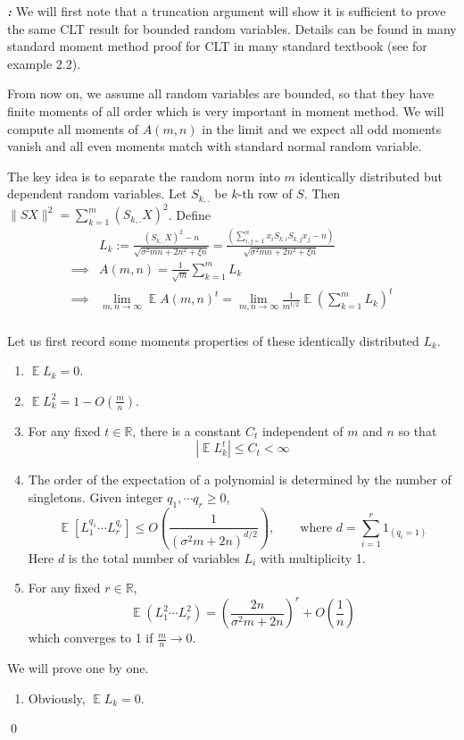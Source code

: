 \documentclass[12pt]{extarticle}
\renewenvironment{proof}[1][\proofname]{ { \it\bfseries #1: }}{\qed}
\newcommand{\field}[1]{\mathbb{#1}}
\newcommand{\R}{\field{R}}
\newcommand{\1}{\field{1}}
\DeclareMathOperator{\E}{\mathbb{E}}
\numberwithin{equation}{section}
\begin{document}
\begin{proof}
We will first note that a truncation argument will show it is sufficient to prove the same CLT result for bounded random variables. Details can be found in many standard moment method proof for CLT in many standard textbook (see for example \cite{tao2011topics} 2.2).

From now on, we assume all random variables are bounded, so that they have finite moments of all order which is very important in moment method. We will compute all moments of $A(m,n)$ in the limit and we expect all odd moments vanish and all even moments match with standard normal random variable.

The key idea is to separate the random norm into $m$ identically distributed but dependent random variables. Let $S_{k,.}$ be $k$-th row of $S$. Then $\|SX\|^2 = \sum_{k=1}^m (S_{k,.} X)^2$. Define 
\begin{align*}
 & L_k := \frac{(S_{k,.}X)^2 -n}{\sqrt{\sigma^2 mn+2n^2 + \xi n}} 
 =\frac{(\sum_{i,j=1}^n x_i S_{k,i} S_{k,j}x_j -n)}{\sqrt{\sigma^2 mn+2n^2 + \xi n}}  \\ 
\implies & A(m,n) = \frac{1}{\sqrt{m}} \sum_{k=1}^m L_k \\
\implies & \lim_{m,n\to \infty} \E A(m,n)^t
=\lim_{m,n\to \infty} \frac{1}{m^{t/2}} \E \left(\sum_{k=1}^m L_k \right)^t\\
\end{align*}

\vspace{2em}
Let us first record some moments properties of these identically distributed $L_k$.
\begin{enumerate}[label={(\arabic*)}]
    \item $\E L_k=0$.
    \item $\E L_k^2 = 1 -O(\frac{m}{n})$.
    \item For any fixed $ t\in \R $, there is a constant  $C_t$  independent of $m$ and $n$ so that
    \begin{equation}\label{eqn:L_k bounded moments}
        |\E L_k^t |\le C_t <\infty 
    \end{equation}
    
    \item The order of the expectation of a polynomial is determined by the number of singletons. 
    Given integer $q_1, \cdots q_r \ge 0$,
\begin{equation}
   \E[L_1^{q_1}\cdots L_r^{q_r} ] \le O\left(\frac{1}{\left({\sigma^2 m+2n}\right)^{d/2}}\right), 
   \qquad \text{where } d = \sum_{i=1}^r 1_{(q_i=1)}
   \label{eqn:Rand norm powers of 1 multiply poly}
\end{equation}
 Here $d$ is the total number of variables $L_i$ with multiplicity 1.
    \item For any fixed $r \in \R$, 
    \[ 
    \E (L_{1}^{2} \cdots L_{r}^{2})=\left(\frac{2n}{\sigma^2m + 2n} \right)^r + O(\frac{1}{n})
    \]
    which converges to 1 if $\frac{m}{n} \to 0$.
\end{enumerate}
We will prove one by one.
\begin{enumerate}[label={(\arabic*)}]
\item 
Obviously, $\E L_k = 0$. 


\end{enumerate}
\end{proof}
\end{document}
